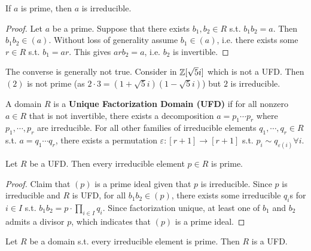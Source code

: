 \documentclass{article}
\begin{document}
\begin{proposition}\label{prop:prime is irreducible}
    If $a$ is prime, then $a$ is irreducible.
\end{proposition}

\begin{proof}
    Let $a$ be a prime. Suppose that there exists $b_1, b_2\in R$ s.t. $b_1 b_2 = a$. Then $b_1 b_2 \in (a)$. Without loss of generality assume $b_1\in (a)$, i.e. there exists some $r\in R$ s.t. $b_1 = ar$. This gives $arb_2 = a$, i.e. $b_2$ is invertible.
\end{proof}

\begin{remark}
    The converse is generally not true. Consider in $\mathbb{Z}[\sqrt{5}i]$ which is not a UFD. Then $(2)$ is not prime (as $2\cdot 3 = (1 + \sqrt{5}i)(1 - \sqrt{5}i)$) but $2$ is irreducible.
\end{remark}

\begin{definition}
    A domain $R$ is a \textbf{Unique Factorization Domain (UFD)} if for all  nonzero $a\in R$ that is not invertible, there exists a decomposition $a = p_1\cdots p_r$ where $p_1, \cdots, p_r$ are irreducible. For all other families of irreducible elements $q_1, \cdots, q_r \in R$ s.t. $a = q_1\cdots q_r$, there exists a permutation $\varepsilon: [r+1] \to [r+1]$ s.t. $p_i \sim q_{\varepsilon(i)} \forall i$. 
\end{definition}

\begin{proposition}\label{prop:UFD irreducible is prime}
    Let $R$ be a UFD. Then every irreducible element $p\in R$ is prime.    
\end{proposition}

\begin{proof}
    Claim that $(p)$ is a prime ideal given that $p$ is irreducible. Since $p$ is irreducible and $R$ is UFD, for all $b_1 b_2\in (p)$, there exists some irreducible $q_i$s for $i\in I$ s.t. $b_1 b_2 = p\cdot \prod_{i\in I} q_i$. Since factorization unique, at least one of $b_1$ and $b_2$ admits a divisor $p$, which indicates that $(p)$ is a prime ideal. 
\end{proof}

\begin{proposition}\label{prop:irreducible is prime implies UFD}
    Let $R$ be a domain s.t. every irreducible element is prime. Then $R$ is a UFD.
\end{proposition}
\end{document}
